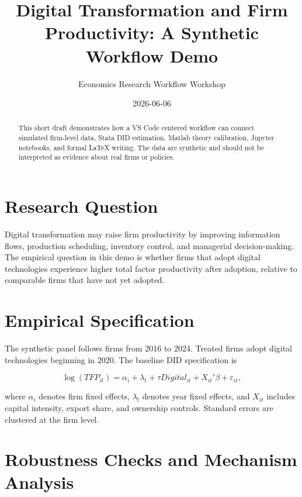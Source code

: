 \documentclass[11pt]{article}
\title{Digital Transformation and Firm Productivity: A Synthetic Workflow Demo}
\author{Economics Research Workflow Workshop}
\date{2026-06-06}
\begin{document}
\maketitle

\begin{abstract}
This short draft demonstrates how a VS Code centered workflow can connect simulated firm-level data, Stata DID estimation, Matlab theory calibration, Jupyter notebooks, and formal \LaTeX{} writing. The data are synthetic and should not be interpreted as evidence about real firms or policies.
\end{abstract}

\section{Research Question}

Digital transformation may raise firm productivity by improving information flows, production scheduling, inventory control, and managerial decision-making. The empirical question in this demo is whether firms that adopt digital technologies experience higher total factor productivity after adoption, relative to comparable firms that have not yet adopted.

\section{Empirical Specification}

The synthetic panel follows firms from 2016 to 2024. Treated firms adopt digital technologies beginning in 2020. The baseline DID specification is

\begin{equation}
\log(TFP_{it}) = \alpha_i + \lambda_t + \tau Digital_{it} + X_{it}'\beta + \varepsilon_{it},
\end{equation}

where $\alpha_i$ denotes firm fixed effects, $\lambda_t$ denotes year fixed effects, and $X_{it}$ includes capital intensity, export share, and ownership controls. Standard errors are clustered at the firm level.

\section{Robustness Checks and Mechanism Analysis}
\end{document}
